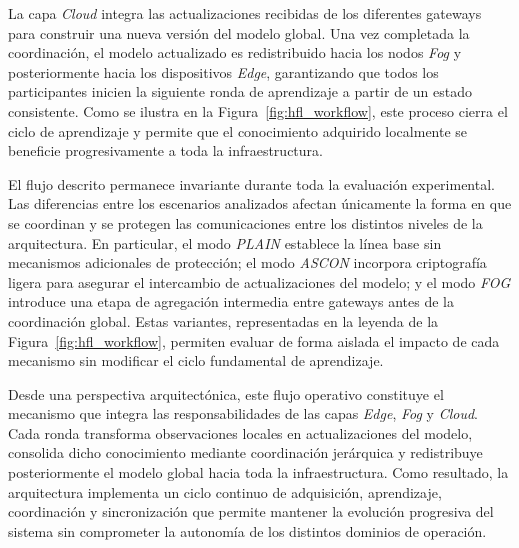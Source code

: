 \documentclass[journal,article,submit,moreauthors]{Definitions/mdpi}
\begin{document}
La capa \textit{Cloud} integra las actualizaciones recibidas de los diferentes gateways para construir una nueva versión del modelo global. Una vez completada la coordinación, el modelo actualizado es redistribuido hacia los nodos \textit{Fog} y posteriormente hacia los dispositivos \textit{Edge}, garantizando que todos los participantes inicien la siguiente ronda de aprendizaje a partir de un estado consistente. Como se ilustra en la Figura~\ref{fig:hfl_workflow}, este proceso cierra el ciclo de aprendizaje y permite que el conocimiento adquirido localmente se beneficie progresivamente a toda la infraestructura.

El flujo descrito permanece invariante durante toda la evaluación experimental. Las diferencias entre los escenarios analizados afectan únicamente la forma en que se coordinan y se protegen las comunicaciones entre los distintos niveles de la arquitectura. En particular, el modo \textit{PLAIN} establece la línea base sin mecanismos adicionales de protección; el modo \textit{ASCON} incorpora criptografía ligera para asegurar el intercambio de actualizaciones del modelo; y el modo \textit{FOG} introduce una etapa de agregación intermedia entre gateways antes de la coordinación global. Estas variantes, representadas en la leyenda de la Figura~\ref{fig:hfl_workflow}, permiten evaluar de forma aislada el impacto de cada mecanismo sin modificar el ciclo fundamental de aprendizaje.
%

Desde una perspectiva arquitectónica, este flujo operativo constituye el mecanismo que integra las responsabilidades de las capas \textit{Edge}, \textit{Fog} y \textit{Cloud}. Cada ronda transforma observaciones locales en actualizaciones del modelo, consolida dicho conocimiento mediante coordinación jerárquica y redistribuye posteriormente el modelo global hacia toda la infraestructura. Como resultado, la arquitectura implementa un ciclo continuo de adquisición, aprendizaje, coordinación y sincronización que permite mantener la evolución progresiva del sistema sin comprometer la autonomía de los distintos dominios de operación.
\end{document}
